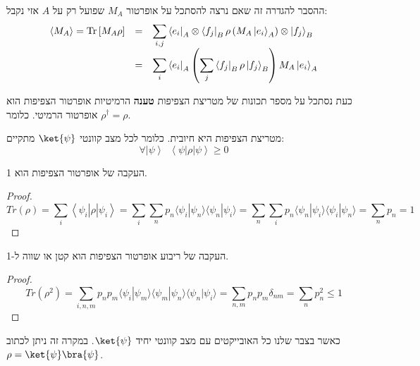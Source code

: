 \documentclass{tstextbook}
\begin{document}
ההסבר להגדרה זה שאם נרצה להסתכל על אופרטור \(M_{A}\) שפועל רק על \(A\) אזי נקבל:
$$\begin{array}{r c l}{{\left<M_{A}\right>=\mathrm{Tr}\left[M_{A}\rho\right]}}&{{=}}&{{\displaystyle\sum_{i,j}\left<e_{i}\right|_{A}\otimes\left<f_{j}\right|_{B}\rho\left(M_{A}\left|e_{i}\right>_{A}\right)\otimes\left|f_{j}\right>_{B}}}\\ {{}}&{{=}}&{{\displaystyle\sum_{i}\left<e_{i}\right|_{A}\left(\sum_{j}\left<f_{j}\right|_{B}\rho\left|f_{j}\right>_{B}\right)M_{A}\left|e_{i}\right>_{A}}}\end{array}$$

כעת נסתכל על מספר תכונות של מטריצת הצפיפות
\textbf{טענה} הרמיטיות
אופרטור הצפיפות הוא אופרטור הרמיטי. כלומר \(\rho ^{\dagger}=\rho\).

\begin{proposition}[חיוביות]
מטריצת הצפיפות היא חיובית. כלומר לכל מצב קוונטי \(\ket{\psi}\) מתקיים:
$$\forall\left|\psi\right\rangle\;\;\left\langle\psi\right|\rho\left|\psi\right\rangle\geq0$$

\end{proposition}
\begin{proposition}[נרמול]
העקבה של אופרטור הצפיפות הוא 1.

\end{proposition}
\begin{proof}
$$T r\left(\rho\right)=\sum_{i}\left\langle\psi_{i}\right|\rho\left|\psi_{i}\right\rangle=\sum_{i}\sum_{n}p_{n}\langle\psi_{i}|\psi_{n}\rangle\langle\psi_{n}|\psi_{i}\rangle=\sum_{n}\sum_{i}p_{n}\langle\psi_{n}|\psi_{i}\rangle\langle\psi_{i}|\psi_{n}\rangle=\sum_{n}p_{n}=1$$

\end{proof}
\begin{proposition}
העקבה של ריבוע אופרטור הצפיפות הוא קטן או שווה ל-1. 

\end{proposition}
\begin{proof}
$$T r\left(\rho^{2}\right)=\sum_{i,n,m}p_{n}p_{m}\langle\psi_{i}|\psi_{m}\rangle\langle\psi_{m}|\psi_{n}\rangle\langle\psi_{n}|\psi_{i}\rangle=\sum_{n,m}p_{n}p_{m}\delta_{n m}=\sum_{n}p_{n}^{2}\leq1$$

\end{proof}
\begin{definition}
כאשר בצבר שלנו כל האובייקטים עם מצב קוונטי יחיד \(\ket{\psi}\). במקרה זה ניתן לכתוב \(\rho=\ket{\psi}\bra{\psi}\).

\end{definition}
\end{document}
